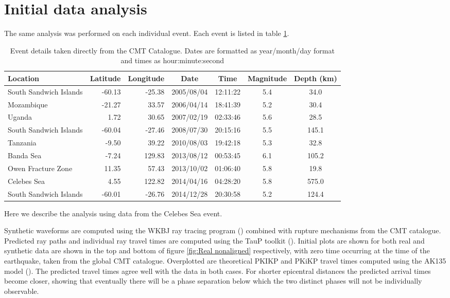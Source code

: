 \documentclass[11pt,a4paper]{article}
\begin{document}
\section{Initial data analysis}
\label{sec:Initial analysis}
The same analysis was performed on each individual event. Each event is listed in table \ref{tab:Events}.
\begin{table}\footnotesize
\centering
\begin{tabular}{| l | r | r | c | c | c | c |}
	\hline Location				& Latitude	& Longitude	& Date		& Time		& Magnitude	& Depth (km) 	\\ \hline
	\hline South Sandwich Islands	& -60.13	& -25.38		& 2005/08/04	& 12:11:22	& 5.4			& 34.0		\\
	\hline Mozambique			& -21.27	& 33.57		& 2006/04/14	& 18:41:39	& 5.2			& 30.4		\\
	\hline Uganda				& 1.72	& 30.65		& 2007/02/19	& 02:33:46	& 5.6			& 28.5		\\
	\hline South Sandwich Islands	& -60.04	& -27.46		& 2008/07/30	& 20:15:16	& 5.5			& 145.1		\\
	\hline Tanzania				& -9.50	& 39.22		& 2010/08/03	& 19:42:18	& 5.3			& 32.8		\\
	\hline Banda Sea			& -7.24	& 129.83		& 2013/08/12	& 00:53:45	& 6.1			& 105.2		\\
	\hline Owen Fracture Zone	& 11.35	& 57.43		& 2013/10/02	& 01:06:40	& 5.8			& 19.8		\\
	\hline Celebes Sea			& 4.55	& 122.82		& 2014/04/16	& 04:28:20	& 5.8			& 575.0  		\\ 
	\hline South Sandwich Islands 	& -60.01	& -26.76		& 2014/12/28	& 20:30:58	& 5.2			& 124.4		\\
	\hline	
\end{tabular}
\caption{Event details taken directly from the CMT Catalogue. Dates are formatted as year/month/day format and times as hour:minute:second}
\label{tab:Events}
\end{table}
Here we describe the analysis using data from the Celebes Sea event.

Synthetic waveforms are computed using the WKBJ ray tracing program (\cite{Chapman1976}) combined with rupture mechanisms from the CMT catalogue. Predicted ray paths and individual ray travel times are computed using the TauP toolkit (\cite{Crotwell1999}). Initial plots are shown for both real and synthetic data are shown in the top and bottom of figure \ref{fig:Real nonaligned} respectively, with zero time occurring at the time of the earthquake, taken from the global CMT catalogue. Overplotted are theoretical PKIKP and PKiKP travel times computed using the AK135 model (\cite{Kennett1995b}). The predicted travel times agree well with the data in both cases.  For shorter epicentral distances the predicted arrival times become closer, showing that eventually there will be a phase separation below which the two distinct phases will not be individually observable.
\end{document}
